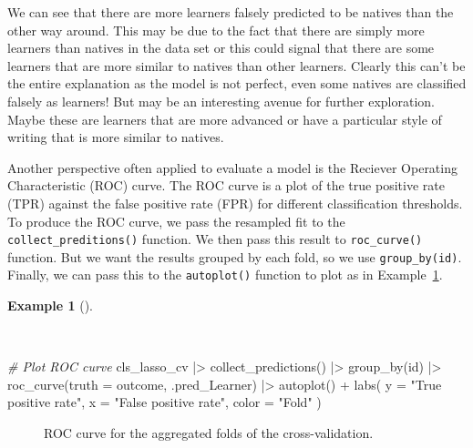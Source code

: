 \documentclass[
  letterpaper,
  DIV=11,
  numbers=noendperiod]{scrreprt}
\newenvironment{Shaded}{\begin{snugshade}}{\end{snugshade}}
\newcommand{\AttributeTok}[1]{\textcolor[rgb]{0.00,0.00,0.00}{#1}}
\newcommand{\CommentTok}[1]{\textcolor[rgb]{0.00,0.00,0.00}{\textit{#1}}}
\newcommand{\FunctionTok}[1]{\textcolor[rgb]{0.00,0.00,0.00}{#1}}
\newcommand{\NormalTok}[1]{\textcolor[rgb]{0.00,0.00,0.00}{#1}}
\newcommand{\SpecialCharTok}[1]{\textcolor[rgb]{0.00,0.00,0.00}{#1}}
\newcommand{\StringTok}[1]{\textcolor[rgb]{0.00,0.00,0.00}{#1}}
\theoremstyle{definition}
\newtheorem{example}{Example}[chapter]
\theoremstyle{remark}
\begin{document}
We can see that there are more learners falsely predicted to be natives
than the other way around. This may be due to the fact that there are
simply more learners than natives in the data set or this could signal
that there are some learners that are more similar to natives than other
learners. Clearly this can't be the entire explanation as the model is
not perfect, even some natives are classified falsely as learners! But
may be an interesting avenue for further exploration. Maybe these are
learners that are more advanced or have a particular style of writing
that is more similar to natives.

Another perspective often applied to evaluate a model is the Reciever
Operating Characteristic (ROC) curve. The ROC curve is a plot of the
true positive rate (TPR) against the false positive rate (FPR) for
different classification thresholds. To produce the ROC curve, we pass
the resampled fit to the \texttt{collect\_preditions()} function. We
then pass this result to \texttt{roc\_curve()} function. But we want the
results grouped by each fold, so we use \texttt{group\_by(id)}. Finally,
we can pass this to the \texttt{autoplot()} function to plot as in
Example~\ref{exm-pda-class-tune-hyperparameters-evaluate-workflow-cv-roc}.

\begin{example}[]\protect\hypertarget{exm-pda-class-tune-hyperparameters-evaluate-workflow-cv-roc}{}\label{exm-pda-class-tune-hyperparameters-evaluate-workflow-cv-roc}

~

\begin{Shaded}
\begin{Highlighting}[]
\CommentTok{\# Plot ROC curve}
\NormalTok{cls\_lasso\_cv }\SpecialCharTok{|\textgreater{}}
  \FunctionTok{collect\_predictions}\NormalTok{() }\SpecialCharTok{|\textgreater{}}
  \FunctionTok{group\_by}\NormalTok{(id) }\SpecialCharTok{|\textgreater{}}
  \FunctionTok{roc\_curve}\NormalTok{(}\AttributeTok{truth =}\NormalTok{ outcome, .pred\_Learner) }\SpecialCharTok{|\textgreater{}}
  \FunctionTok{autoplot}\NormalTok{() }\SpecialCharTok{+}
  \FunctionTok{labs}\NormalTok{(}
    \AttributeTok{y =} \StringTok{"True positive rate"}\NormalTok{,}
    \AttributeTok{x =} \StringTok{"False positive rate"}\NormalTok{,}
    \AttributeTok{color =} \StringTok{"Fold"}
\NormalTok{  )}
\end{Highlighting}
\end{Shaded}

\begin{figure}[H]


\caption{\label{fig-pda-class-tune-hyperparameters-evaluate-workflow-cv-roc}ROC
curve for the aggregated folds of the cross-validation.}

\end{figure}%

\end{example}
\end{document}
